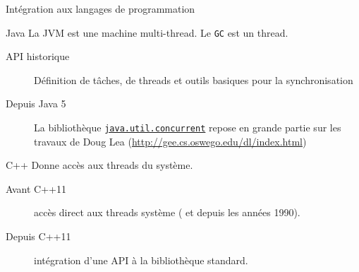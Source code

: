 
\begingroup

\begin{frame}{Intégration aux langages de programmation}
  
\vfill
  \begin{block}{Java}
        La JVM est une machine multi-thread. Le \texttt{GC} est un thread.

    \begin{description}
    \item[API historique] Définition de tâches, de threads et outils basiques pour la synchronisation
    \item[Depuis Java 5] La bibliothèque \href{https://docs.oracle.com/javase/8/docs/api/java/util/concurrent/package-summary.html}{\lstinline{java.util.concurrent}}
    repose en grande partie sur les travaux de Doug Lea (\url{http://gee.cs.oswego.edu/dl/index.html})
    \end{description}
    \end{block}
\vfill
\begin{block}{C++}
    Donne accès aux threads du système.
    \begin{description}
    \item[Avant C++11] accès direct aux threads système ( et  depuis les années 1990).
    \item[Depuis C++11] intégration d'une API à la bibliothèque standard.
    \end{description}
    \end{block}
\vfill

\end{frame}

\endgroup
\endinput
